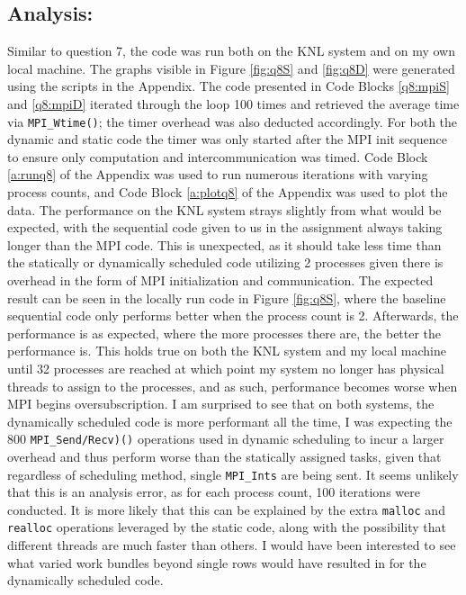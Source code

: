 \documentclass[11pt]{article}
\begin{document}
\subsection*{Analysis:}

Similar to question 7, the code was run both on the KNL system and on my own local machine.
The graphs visible in Figure \ref{fig:q8S} and \ref{fig:q8D} were generated using the scripts in the Appendix. 
The code presented in Code Blocks \ref{q8:mpiS} and \ref{q8:mpiD} iterated through the loop 100 times and retrieved the average time via \texttt{MPI\_Wtime()}; the timer overhead was also deducted accordingly.
For both the dynamic and static code the timer was only started after the MPI init sequence to ensure only computation and intercommunication was timed.
Code Block \ref{a:runq8} of the Appendix was used to run numerous iterations with varying process counts, and Code Block \ref{a:plotq8} of the Appendix was used to plot the data.
The performance on the KNL system strays slightly from what would be expected, with the sequential code given to us in the assignment always taking longer than the MPI code. 
This is unexpected, as it should take less time than the statically or dynamically scheduled code utilizing 2 processes given there is overhead in the form of MPI initialization and communication.
The expected result can be seen in the locally run code in Figure \ref{fig:q8S}, where the baseline sequential code only performs better when the process count is 2.
Afterwards, the performance is as expected, where the more processes there are, the better the performance is. 
This holds true on both the KNL system and my local machine until 32 processes are reached at which point my system no longer has physical threads to assign to the processes, and as such, performance becomes worse when MPI begins oversubscription.
I am surprised to see that on both systems, the dynamically scheduled code is more performant all the time, I was expecting the 800 \texttt{MPI\_Send/Recv)()} operations used in dynamic scheduling to incur a larger overhead and thus perform worse than the statically assigned tasks, given that regardless of scheduling method, single \texttt{MPI\_Ints} are being sent.
It seems unlikely that this is an analysis error, as for each process count, 100 iterations were conducted.
It is more likely that this can be explained by the extra \texttt{malloc} and \texttt{realloc} operations leveraged by the static code, along with the possibility that different threads are much faster than others.
I would have been interested to see what varied work bundles beyond single rows would have resulted in for the dynamically scheduled code.
\end{document}
